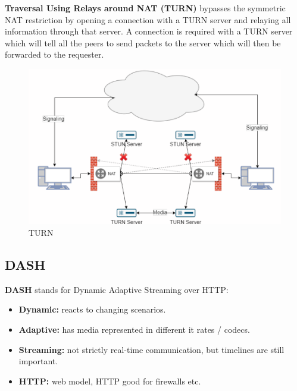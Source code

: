 \documentclass[a4paper,11pt]{article}
\begin{document}
\textbf{Traversal Using Relays around NAT (TURN)} bypasses the symmetric NAT restriction by opening a connection with a TURN server and relaying all information through that server.
A connection is required with a TURN server which will tell all the peers to send packets to the server which will then be forwarded to the requester.
\begin{figure}[H]
    \centering
    \includegraphics[width=\textwidth]{./images/turn.png}
    \caption{TURN}
\end{figure}

\subsection{DASH}
\textbf{DASH} stands for Dynamic Adaptive Streaming over HTTP:
\begin{itemize}
    \item   \textbf{Dynamic:}  reacts to changing scenarios.
    \item   \textbf{Adaptive:} has media represented in different it rates / codecs.
    \item   \textbf{Streaming:} not strictly real-time communication, but timelines are still important.
    \item   \textbf{HTTP:} web model, HTTP good for firewalls etc.
\end{itemize}
\end{document}
